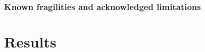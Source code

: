 \documentclass[12pt,a4paper,oneside]{article}
\begin{document}
\subsubsection{Known fragilities and acknowledged limitations}\label{subsubsec:symbolic_fragilities_limits}

%
%
%
%
%




\newpage
\section{Results}\label{sec:results}

\end{document}
